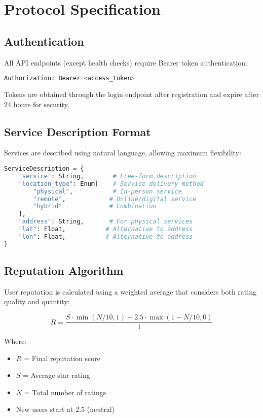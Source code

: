 \documentclass[11pt,a4paper]{article}
\begin{document}
\section{Protocol Specification}

\subsection{Authentication}

All API endpoints (except health checks) require Bearer token authentication:

\begin{lstlisting}[language=bash]
Authorization: Bearer <access_token>
\end{lstlisting}

Tokens are obtained through the login endpoint after registration and expire after 24 hours for security.

\subsection{Service Description Format}

Services are described using natural language, allowing maximum flexibility:

\begin{lstlisting}[language=Python]
ServiceDescription = {
    "service": String,        # Free-form description
    "location_type": Enum[    # Service delivery method
        "physical",           # In-person service
        "remote",            # Online/digital service
        "hybrid"             # Combination
    ],
    "address": String,       # For physical services
    "lat": Float,           # Alternative to address
    "lon": Float,           # Alternative to address
}
\end{lstlisting}

\subsection{Reputation Algorithm}

User reputation is calculated using a weighted average that considers both rating quality and quantity:

\begin{equation}
R = \frac{S \cdot \min(N/10, 1) + 2.5 \cdot \max(1 - N/10, 0)}{1}
\end{equation}

Where:
\begin{itemize}
    \item $R$ = Final reputation score
    \item $S$ = Average star rating
    \item $N$ = Total number of ratings
    \item New users start at 2.5 (neutral)
\end{itemize}
\end{document}
